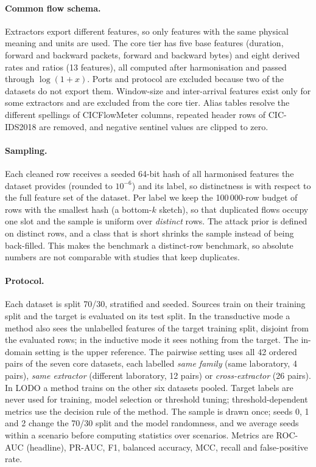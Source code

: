\documentclass[11pt]{article}
\begin{document}
\paragraph{Common flow schema.}
Extractors export different features, so only features with the same physical meaning and units are used.
The core tier has five base features (duration, forward and backward packets, forward and backward bytes) and eight derived rates and ratios (13 features), all computed after harmonisation and passed through $\log(1+x)$.
Ports and protocol are excluded because two of the datasets do not export them.
Window-size and inter-arrival features exist only for some extractors and are excluded from the core tier.
Alias tables resolve the different spellings of CICFlowMeter columns, repeated header rows of CIC-IDS2018 are removed, and negative sentinel values are clipped to zero.

\paragraph{Sampling.}
Each cleaned row receives a seeded 64-bit hash of all harmonised features the dataset provides (rounded to $10^{-6}$) and its label, so distinctness is with respect to the full feature set of the dataset.
Per label we keep the 100\,000-row budget of rows with the smallest hash (a bottom-$k$ sketch), so that duplicated flows occupy one slot and the sample is uniform over \emph{distinct} rows.
The attack prior is defined on distinct rows, and a class that is short shrinks the sample instead of being back-filled.
This makes the benchmark a distinct-row benchmark, so absolute numbers are not comparable with studies that keep duplicates.

\paragraph{Protocol.}
Each dataset is split 70/30, stratified and seeded.
Sources train on their training split and the target is evaluated on its test split.
In the transductive mode a method also sees the unlabelled features of the target training split, disjoint from the evaluated rows; in the inductive mode it sees nothing from the target.
The in-domain setting is the upper reference.
The pairwise setting uses all 42 ordered pairs of the seven core datasets, each labelled \emph{same family} (same laboratory, 4 pairs), \emph{same extractor} (different laboratory, 12 pairs) or \emph{cross-extractor} (26 pairs).
In LODO a method trains on the other six datasets pooled.
Target labels are never used for training, model selection or threshold tuning; threshold-dependent metrics use the decision rule of the method.
The sample is drawn once; seeds 0, 1 and 2 change the 70/30 split and the model randomness, and we average seeds within a scenario before computing statistics over scenarios.
Metrics are ROC-AUC (headline), PR-AUC, F1, balanced accuracy, MCC, recall and false-positive rate.
\end{document}
